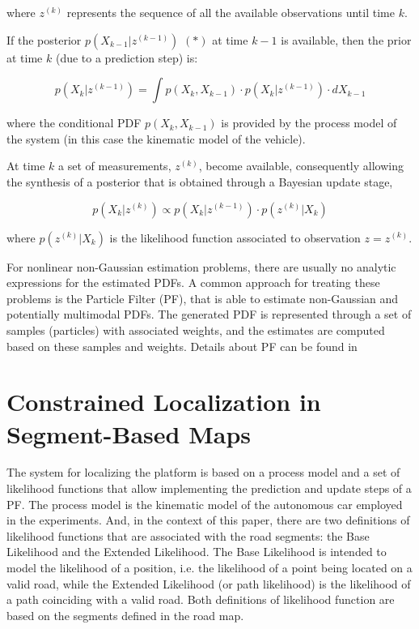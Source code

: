 where $z^{\left( k\right)}$ represents the sequence of all the available observations until time $k$.

If the posterior $p\left( X_{k-1} | z^{\left( k-1\right)}\right)$ $\left( *\right)$ at time $k-1$ is available, then the prior at time $k$ (due to a prediction step) is:

\begin{equation}
\label{Eq::ch2-3}
p\left( X_{k} | z^{\left( k-1\right)}\right) = \int  p\left( X_{k}, X_{k-1}\right) \cdotp p\left( X_{k} | z^{\left( k-1\right)}\right) \cdotp dX_{k-1}   
\end{equation}

where the conditional PDF $p\left( X_{k}, X_{k-1}\right)$ is provided by the process model of the system (in this case the kinematic model of the vehicle).

At time $k$ a set of measurements,  $z^{\left( k\right)}$, become available, consequently allowing the synthesis of a posterior that is obtained through a Bayesian update stage,

\begin{equation}
\label{Eq::ch2-4}
p\left( X_{k} | z^{\left( k\right)}\right) \propto p\left( X_{k} | z^{\left( k-1\right)}\right) \cdotp p\left( z^{\left( k\right)} | X_{k}\right)
\end{equation}

where $p\left( z^{\left( k\right)} | X_{k}\right)$ is the likelihood function associated to observation $z=z^{\left( k\right)}$.

For nonlinear non-Gaussian estimation problems, there are usually no analytic expressions for the estimated PDFs. A common approach for treating these problems is the Particle Filter (PF), that is able to estimate non-Gaussian and potentially multimodal PDFs. The generated PDF is represented through a set of samples (particles) with associated weights, and the estimates are computed based on these samples and weights. Details about PF can be found in \cite{Thrun:2005:PR:1121596, Thrun00j}

\section{Constrained Localization in Segment-Based Maps}

The system for localizing the platform is based on a process model and a set of likelihood functions that allow implementing the prediction and update steps of a PF. The process model is the kinematic model of the autonomous car employed in the experiments. And, in the context of this paper, there are two definitions of likelihood functions that are associated with the road segments: the Base Likelihood and the Extended Likelihood. The Base Likelihood is intended to model the likelihood of a position, i.e. the likelihood of a point being located on a valid road, while the Extended Likelihood (or path likelihood) is the likelihood of a path coinciding with a valid road. Both definitions of likelihood function are based on the segments defined in the road map.

